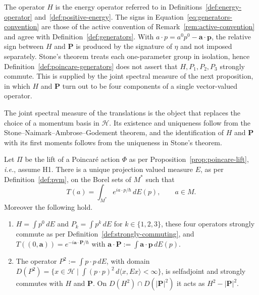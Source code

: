 \begin{remark}\label{rem:generators-conventions}
	The operator $H$ is the energy operator referred to in Definitions~\ref{def:energy-operator} and~\ref{def:positive-energy}. The signs in Equation~\eqref{eq:generators-convention} are those of the active convention of Remark~\ref{rem:active-convention} and agree with Definition~\ref{def:generators}. With $a\cdot p=a^0p^0-\mathbf{a}\cdot\mathbf{p}$, the relative sign between $H$ and $\mathbf{P}$ is produced by the signature of $\eta$ and not imposed separately. Stone's theorem treats each one-parameter group in isolation, hence Definition~\ref{def:poincare-generators} does not assert that $H,P_1,P_2,P_3$ strongly commute. This is supplied by the joint spectral measure of the next proposition, in which $H$ and $\mathbf{P}$ turn out to be four components of a single vector-valued operator.
\end{remark}

The joint spectral measure of the translations is the object that replaces the choice of a momentum basis in $\mathcal{H}$. Its existence and uniqueness follow from the Stone--Naimark--Ambrose--Godement theorem, and the identification of $H$ and $\mathbf{P}$ with its first moments follows from the uniqueness in Stone's theorem.

\begin{proposition}\label{prop:snag-translations}
	Let $\Pi$ be the lift of a Poincar\'e action $\Phi$ as per Proposition~\ref{prop:poincare-lift}, \textit{i.e.}, assume H1. There is a unique projection valued measure $E$, as per Definition~\ref{def:pvm}, on the Borel sets of $M^*$ such that
	\begin{equation}\label{eq:translation-spectral}
		T(a)=\int_{M^*}e^{ia\cdot p/\hbar}\,dE(p), \qquad a\in M.
	\end{equation}
	Moreover the following hold.
	\begin{enumerate}
		\item $H=\int p^0\,dE$ and $P_k=\int p^k\,dE$ for $k\in\{1,2,3\}$, these four operators strongly commute as per Definition~\ref{def:strongly-commuting}, and $T((0,\mathbf{a}))=e^{-i\mathbf{a}\cdot\mathbf{P}/\hbar}$ with $\mathbf{a}\cdot\mathbf{P}:=\int\mathbf{a}\cdot\mathbf{p}\,dE(p)$.
		\item The operator $P^2:=\int p\cdot p\,dE$, with domain $D(P^2)=\{x\in\mathcal{H}\mid\int(p\cdot p)^2\,d\langle x,Ex\rangle<\infty\}$, is selfadjoint and strongly commutes with $H$ and $\mathbf{P}$. On $D(H^2)\cap D(|\mathbf{P}|^2)$ it acts as $H^2-|\mathbf{P}|^2$.
	\end{enumerate}
\end{proposition}

